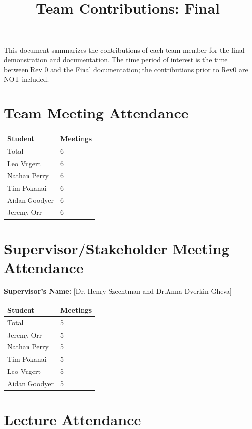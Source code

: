 \documentclass{article}
\title{Team Contributions: Final\\\progname}
\author{\authname}
\date{}
\begin{document}
\maketitle

This document summarizes the contributions of each team member for the final
demonstration and documentation.  The time period of interest is the time
between Rev 0 and the Final documentation; the contributions prior to Rev0 are
NOT included.

\section{Team Meeting Attendance}

\begin{table}[H]
\centering
\begin{tabular}{ll}
\toprule
\textbf{Student} & \textbf{Meetings}\\
\midrule
Total & 6\\
Leo Vugert & 6\\
Nathan Perry & 6\\
Tim Pokanai & 6\\
Aidan Goodyer & 6\\
Jeremy Orr & 6\\
\bottomrule
\end{tabular}
\end{table}

\section{Supervisor/Stakeholder Meeting Attendance}

\noindent \textbf{Supervisor's Name: } [Dr. Henry Szechtman and Dr.Anna Dvorkin-Gheva]

\begin{table}[H]
\centering
\begin{tabular}{ll}
\toprule
\textbf{Student} & \textbf{Meetings}\\
\midrule
Total & 5\\
Jeremy Orr & 5\\
Nathan Perry & 5\\
Tim Pokanai & 5\\
Leo Vugert & 5\\
Aidan Goodyer & 5\\
\bottomrule
\end{tabular}
\end{table}

\section{Lecture Attendance}
\end{document}
